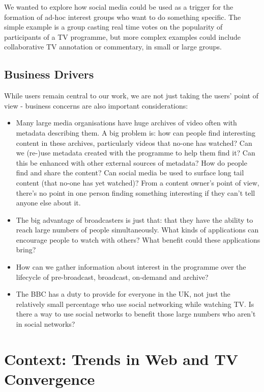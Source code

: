 \documentclass{notube}
\begin{document}
We wanted to explore how social media could be used as a trigger for the formation of ad-hoc interest groups who want to do something specific. The simple example is a group casting real time votes on the popularity of participants of a TV programme, but more complex examples could include collaborative TV annotation or commentary, in small or large groups.  

\section{Business Drivers}

While users remain central to our work, we are not just taking the users' point of view - business concerns are also important considerations:

\begin{itemize}
\item{Many large media organisations have huge archives of video often with metadata describing them. A big problem is: how can people find interesting content in these archives, particularly videos that no-one has watched? Can we (re-)use metadata created with the programme to help them find it? Can this be enhanced with other external sources of metadata? How do people find and share the content? Can social media be used to surface long tail content (that no-one has yet watched)? From a content owner's point of view, there's no point in one person finding something interesting if they can't tell anyone else about it.}
\item{The big advantage of broadcasters is just that: that they have the ability to reach large numbers of people simultaneously. What kinds of applications can encourage people to watch with others? What benefit could these applications bring?}
\item{How can we gather information about interest in the programme over the lifecycle of pre-broadcast, broadcast, on-demand and archive?}
\item{The BBC has a duty to provide for everyone in the UK, not just the relatively small percentage who use social networking while watching TV. Is there a way to use social networks to benefit those large numbers who aren't in social networks?}
\end{itemize}

\chapter{Context: Trends in Web and TV Convergence}
\end{document}
